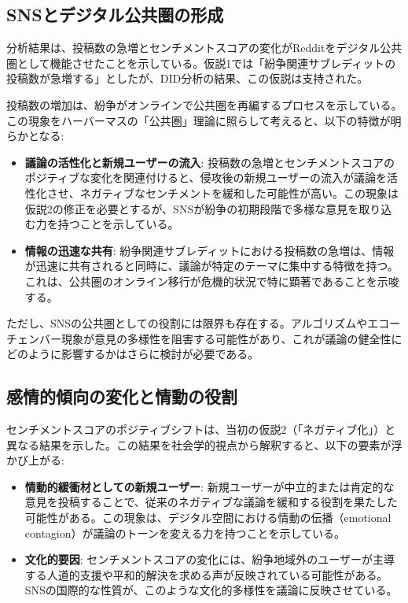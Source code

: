 \documentclass[11pt, a4j]{jreport}
\begin{document}
    \subsection{SNSとデジタル公共圏の形成}
    分析結果は、投稿数の急増とセンチメントスコアの変化がRedditをデジタル公共圏として機能させたことを示している。仮説1では「紛争関連サブレディットの投稿数が急増する」としたが、DID分析の結果、この仮説は支持された。

    投稿数の増加は、紛争がオンラインで公共圏を再編するプロセスを示している。この現象をハーバーマスの「公共圏」理論\cite{habermas1989structural}に照らして考えると、以下の特徴が明らかとなる:

    \begin{itemize}
        \item \textbf{議論の活性化と新規ユーザーの流入}: 投稿数の急増とセンチメントスコアのポジティブな変化を関連付けると、侵攻後の新規ユーザーの流入が議論を活性化させ、ネガティブなセンチメントを緩和した可能性が高い。この現象は仮説2の修正を必要とするが、SNSが紛争の初期段階で多様な意見を取り込む力を持つことを示している。
        \item \textbf{情報の迅速な共有}: 紛争関連サブレディットにおける投稿数の急増は、情報が迅速に共有されると同時に、議論が特定のテーマに集中する特徴を持つ。これは、公共圏のオンライン移行が危機的状況で特に顕著であることを示唆する。
    \end{itemize}

    ただし、SNSの公共圏としての役割には限界も存在する。アルゴリズムやエコーチェンバー現象\cite{pariser2011filter}が意見の多様性を阻害する可能性があり、これが議論の健全性にどのように影響するかはさらに検討が必要である。

    \subsection{感情的傾向の変化と情動の役割}
    センチメントスコアのポジティブシフトは、当初の仮説2（「ネガティブ化」）と異なる結果を示した。この結果を社会学的視点から解釈すると、以下の要素が浮かび上がる:

    \begin{itemize}
        \item \textbf{情動的緩衝材としての新規ユーザー}: 新規ユーザーが中立的または肯定的な意見を投稿することで、従来のネガティブな議論を緩和する役割を果たした可能性がある。この現象は、デジタル空間における情動の伝播（emotional contagion）\cite{kleinberg2020emotion}が議論のトーンを変える力を持つことを示している。
        \item \textbf{文化的要因}: センチメントスコアの変化には、紛争地域外のユーザーが主導する人道的支援や平和的解決を求める声が反映されている可能性がある。SNSの国際的な性質が、このような文化的多様性を議論に反映させている。
    \end{itemize}
\end{document}
